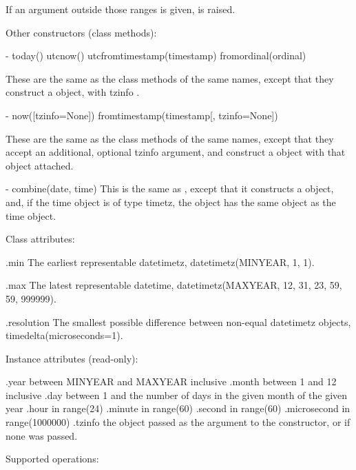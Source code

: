     If an argument outside those ranges is given,
     is raised.

Other constructors (class methods):

  - today()
    utcnow()
    utcfromtimestamp(timestamp)
    fromordinal(ordinal)

    These are the same as the  class methods of the
    same names, except that they construct a 
    object, with tzinfo .

  - now([tzinfo=None])
    fromtimestamp(timestamp[, tzinfo=None])

    These are the same as the  class methods of the same names,
    except that they accept an additional, optional tzinfo argument, and
    construct a  object with that  object attached.

  - combine(date, time)
    This is the same as , except that it constructs
    a  object, and, if the time object is of type timetz,
    the  object has the same  object as the time object.

Class attributes:

    .min
        The earliest representable datetimetz,
        datetimetz(MINYEAR, 1, 1).

    .max
        The latest representable datetime,
        datetimetz(MAXYEAR, 12, 31, 23, 59, 59, 999999).

    .resolution
        The smallest possible difference between non-equal datetimetz
        objects, timedelta(microseconds=1).

Instance attributes (read-only):

    .year           between MINYEAR and MAXYEAR inclusive
    .month          between 1 and 12 inclusive
    .day            between 1 and the number of days in the given month
                    of the given year
    .hour           in range(24)
    .minute         in range(60)
    .second         in range(60)
    .microsecond    in range(1000000)
    .tzinfo         the object passed as the  argument to
                    the  constructor, or 
                    if none was passed.

Supported operations:

